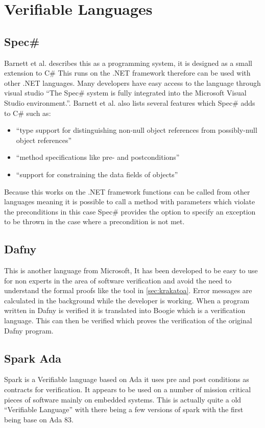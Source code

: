 \documentclass[a4paper,12pt]{scrartcl}
\begin{document}
	\section{Verifiable Languages}
	{
		\subsection{\texorpdfstring{Spec\#}{}}
		{
			Barnett et al. describes this as a programming system, it is designed as a small extension to C\# This runs on the .NET framework therefore can be used with other .NET languages. Many developers have easy access to the language through visual studio \enquote{The Spec\# system is fully integrated into the Microsoft Visual Studio environment.}\cite{Barnett2005}. Barnett et al. also lists several features which Spec\# adds to C\# such as:
			\begin{itemize}
				\item{\enquote{type support for distinguishing non-null object references from possibly-null object references}\cite{Barnett2005}}
				\item{\enquote{method specifications like pre- and postconditions}\cite{Barnett2005}}
				\item{\enquote{support for constraining the data fields of objects}\cite{Barnett2005}}
			\end{itemize}
			Because this works on the .NET framework functions can be called from other languages meaning it is possible to call a method with parameters which violate the preconditions in this case Spec\# provides the option to specify an exception to be thrown in the case where a precondition is not met.
		}
		\subsection{Dafny}
		{
			This is another language from Microsoft, It has been developed to be easy to use for non experts in the area of software verification and avoid the need to understand the formal proofs like the tool in \cref{sec:krakatoa}. Error messages are calculated in the background while the developer is working.\cite{Leino2010} When a program written in Dafny is verified it is translated into Boogie which is a verification language. This can then be verified which proves the verification of the original Dafny program\cite{Leino2008}.
		}
		\subsection{Spark Ada}
		{
			Spark is a Verifiable language based on Ada it uses pre and post conditions as contracts for verification. It appears to be used on a number of mission critical pieces of software mainly on embedded systems. This is actually quite a old \enquote{Verifiable Language} with there being a few versions of spark with the first being base on Ada 83.
		}
}
\end{document}
